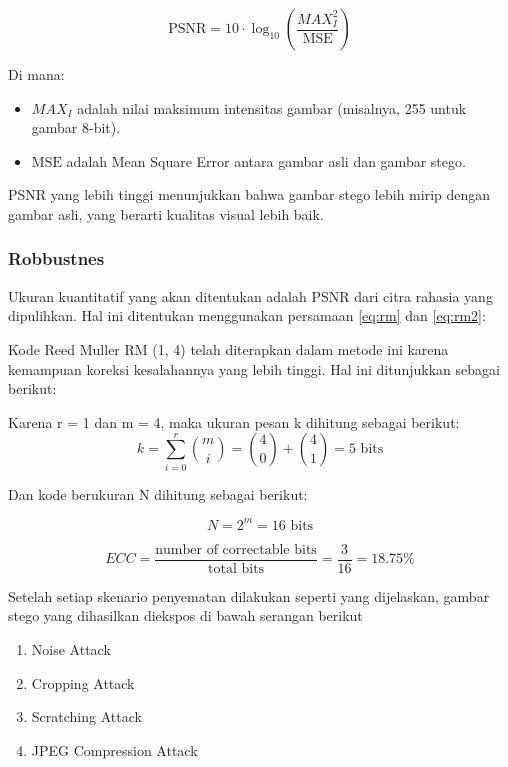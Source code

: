\documentclass{ittelkom}
\begin{document}
\begin{equation}
    \text{PSNR} = 10 \cdot \log_{10} \left( \frac{MAX_I^2}{\text{MSE}} \right)
\end{equation}

Di mana:
\begin{itemize}
    \item $MAX_I$ adalah nilai maksimum intensitas gambar (misalnya, 255 untuk gambar 8-bit).
    \item $\text{MSE}$ adalah Mean Square Error antara gambar asli dan gambar stego.
\end{itemize}

PSNR yang lebih tinggi menunjukkan bahwa gambar stego lebih mirip dengan gambar
asli, yang berarti kualitas visual lebih baik.

\subsubsection{Robbustnes}

Ukuran kuantitatif yang akan ditentukan adalah PSNR dari citra rahasia yang
dipulihkan. Hal ini ditentukan menggunakan persamaan \ref{eq:rm} dan
\ref{eq:rm2}:

Kode Reed Muller RM (1, 4) telah diterapkan dalam metode ini karena kemampuan
koreksi kesalahannya yang lebih tinggi. Hal ini ditunjukkan sebagai berikut:

Karena r = 1 dan m = 4, maka ukuran pesan k dihitung sebagai berikut:
\begin{equation}
    k = \sum_{i=0}^{r} \binom{m}{i} = \binom{4}{0} + \binom{4}{1} = 5 \text{ bits}
    \label{eq:rm}
\end{equation}

Dan kode berukuran N dihitung sebagai berikut:

\begin{equation}
    N = 2^m = 16 \text{ bits}
    \label{eq:rm2}
\end{equation}

\begin{equation}
    ECC = \frac{\text{number of correctable bits}}{\text{total bits}} = \frac{3}{16} = 18.75\%
\end{equation}

Setelah setiap skenario penyematan dilakukan seperti yang dijelaskan, gambar
stego yang dihasilkan diekspos di bawah serangan berikut

\begin{enumerate}
    \item Noise Attack
    \item Cropping Attack
    \item Scratching Attack
    \item JPEG Compression Attack
\end{enumerate}
\end{document}
